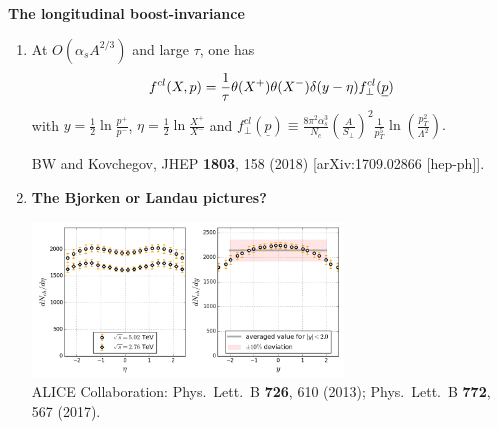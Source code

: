 \documentclass[9pt,a4paper,unknownkeysallowed,xcolor=dvipsnames,aspectratio=43]{beamer}
\begin{document}
\begin{frame}{\bf\huge The longitudinal boost-invariance}	\vspace{2mm}
\begin{enumerate}
\item{\large At $O(\alpha_s A^{2/3})$ and large $\tau$, one has}
\begin{align}
  f^{cl}(X,p)=\frac{1}{\tau} \theta(X^+) \theta(X^-) \delta(y-\eta)
  f_\perp^{cl}(\underline{p})
  \notag
\end{align}
with $y = \frac{1}{2}\ln\frac{p^+}{p^-}$, $\eta = \frac{1}{2}\ln\frac{X^+}{X^-}$ and
$f_\perp^{cl}(\underline{p})\equiv\frac{8\pi^2\alpha_s^3}{N_c}\left(\frac{A}{S_\perp}\right)^2
  \frac{1}{p_T^5}\ln\left(\frac{p_T^2}{\Lambda^2}\right).$
\begin{center}
    {\tiny  {\color{teablue}
  BW and Kovchegov,
  JHEP {\bf 1803}, 158 (2018)
  [arXiv:1709.02866 [hep-ph]].
}}
\end{center}
\vspace{2mm}
\item{\large \color{darkred}\bf The Bjorken or Landau pictures?}
\vspace{2mm}
\begin{center}
\includegraphics[width=0.65\textwidth]{fig/multiplicity}\\
    {\tiny {\color{teablue}
ALICE Collaboration:
  Phys.\ Lett.\ B {\bf 726}, 610 (2013); Phys.\ Lett.\ B {\bf 772}, 567 (2017).
}}
\end{center}

\end{enumerate}
\end{frame}
\end{document}
